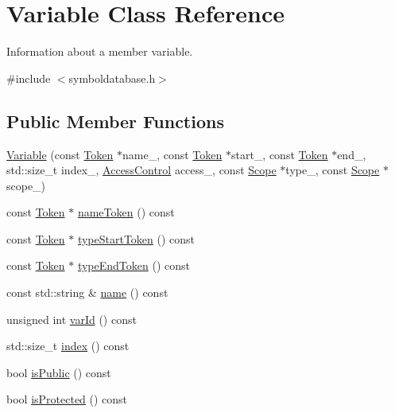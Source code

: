 \hypertarget{class_variable}{\section{Variable Class Reference}
\label{class_variable}
}


Information about a member variable.  




{\ttfamily \#include $<$symboldatabase.\-h$>$}

\subsection*{Public Member Functions}
\begin{DoxyCompactItemize}
\item 
\hyperlink{class_variable_ae4795a1f81f05111d94fc635ba7ebb0c}{Variable} (const \hyperlink{class_token}{Token} $\ast$name\-\_\-, const \hyperlink{class_token}{Token} $\ast$start\-\_\-, const \hyperlink{class_token}{Token} $\ast$end\-\_\-, std\-::size\-\_\-t index\-\_\-, \hyperlink{symboldatabase_8h_a2e9a0288e6c2df2ecebc50944c3ff9fa}{Access\-Control} access\-\_\-, const \hyperlink{class_scope}{Scope} $\ast$type\-\_\-, const \hyperlink{class_scope}{Scope} $\ast$scope\-\_\-)
\item 
const \hyperlink{class_token}{Token} $\ast$ \hyperlink{class_variable_a264a3543a0571a76c50cfd6248fedbab}{name\-Token} () const 
\item 
const \hyperlink{class_token}{Token} $\ast$ \hyperlink{class_variable_a839b1e26a5230f2fdbcfd5dbd2693767}{type\-Start\-Token} () const 
\item 
const \hyperlink{class_token}{Token} $\ast$ \hyperlink{class_variable_a81bb936479ba785c91477fb9f8ddb8b8}{type\-End\-Token} () const 
\item 
const std\-::string \& \hyperlink{class_variable_a2c6138677660d7dee1c32def7b543087}{name} () const 
\item 
unsigned int \hyperlink{class_variable_a6fdefda77025b86ece23818547806911}{var\-Id} () const 
\item 
std\-::size\-\_\-t \hyperlink{class_variable_abfc7e1eb5994a3dbd72ca3aee5499f54}{index} () const 
\item 
bool \hyperlink{class_variable_a3d6e935e2bd18e3cd0a351d8fe5c1ac7}{is\-Public} () const 
\item 
bool \hyperlink{class_variable_a8ccbfc209fe6a4522c4ff7396bb45f1e}{is\-Protected} () const 
\item 

\end{DoxyCompactItemize}
